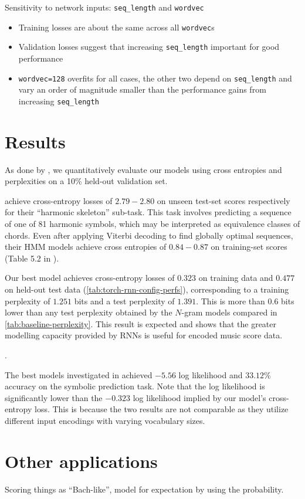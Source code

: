 Sensitivity to network inputs: \texttt{seq\_length} and \texttt{wordvec}
\begin{itemize}
    \item Training losses are about the same across all \texttt{wordvec}s
    \item Validation losses suggest that increasing \texttt{seq\_length} important for good performance 
    \item \texttt{wordvec=128} overfits for all cases, the other two depend on \texttt{seq\_length} and vary an order of magnitude smaller than the performance gains from increasing \texttt{seq\_length}
\end{itemize}

\section{Results}

As done by \citep{bayer2013fast,Boulanger-Lewandowski2012}, we
quantitatively evaluate our models using cross entropies and
perplexities on a 10\% held-out validation set.

\citet{Allan2005} achieve cross-entropy losses of $2.79-2.80$ on unseen
test-set scores respectively for their ``harmonic skeleton'' sub-task. This task
involves predicting a sequence of one of 81 harmonic symbols, which may be
interpreted as equivalence classes of chords. Even after applying Viterbi
decoding to find globally optimal sequences, their HMM models achieve cross
entropies of $0.84-0.87$ on training-set scores (Table 5.2 in
\citet{Allan2005}).

Our best model achieves cross-entropy losses of $0.323$ on
training data and $0.477$ on held-out test data
(\vref{tab:torch-rnn-config-perfs}), corresponding to a training perplexity of
$1.251$ bits and a test perplexity of $1.391$. This is more than $0.6$ bits
lower than any test perplexity obtained by the $N$-gram models compared in
\vref{tab:baseline-perplexity}. This result is expected and shows that the
greater modelling capacity provided by RNNs is useful for encoded music score
data.

.

The best models investigated in \citet{Boulanger-Lewandowski2012} achieved
$-5.56$ log likelihood and $33.12\%$ accuracy on the symbolic prediction task.
Note that the log likelihood is significantly lower than the $-0.323$ log
likelihood implied by our model's cross-entropy loss. This is because the two
results are not comparable as they utilize different input encodings with
varying vocabulary sizes.


\section{Other applications}

Scoring things as ``Bach-like'', model for expectation by using the probability.
